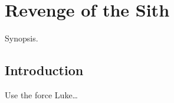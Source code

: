 \chapter{Revenge of the Sith}\label{chapter:revenge-of-sith}


\begin{synopsis}

Synopsis.

\end{synopsis}

\section{Introduction}\label{introduction}

Use the force Luke\ldots{}
